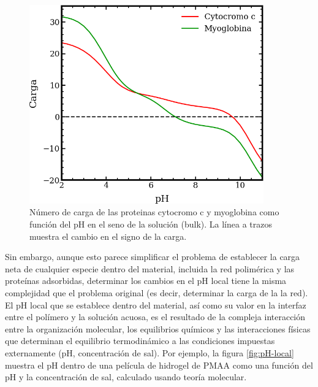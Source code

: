 \begin{figure}
    \centering
    \includegraphics[width=0.9\textwidth]{Figures/graph-film/carga-proteinas.png}
    \caption{N\'umero de carga de las proteinas cytocromo c y myoglobina como  funci\'on del pH en el seno de la soluci\'on (bulk). La l\'inea a trazos muestra el cambio en el signo de la carga.}
    \label{fig:protein-charge}
\end{figure}



Sin embargo, aunque esto parece simplificar el problema de establecer la carga neta de cualquier especie dentro del material, incluida la red polimérica y las proteínas adsorbidas, determinar los cambios en el pH local tiene la misma complejidad que el problema original (es decir, determinar la carga de la la red). El pH local que se establece dentro del material, así como su valor en la interfaz entre el polímero y la solución acuosa, es el resultado de la compleja interacción entre la organización molecular, los equilibrios químicos y las interacciones físicas que determinan el equilibrio termodinámico a las condiciones impuestas externamente (pH, concentración de sal). Por ejemplo, la figura \ref{fig:pH-local} muestra el pH dentro de una película de hidrogel de PMAA como una función del pH  y la concentración de sal, calculado usando teor\'ia molecular.

